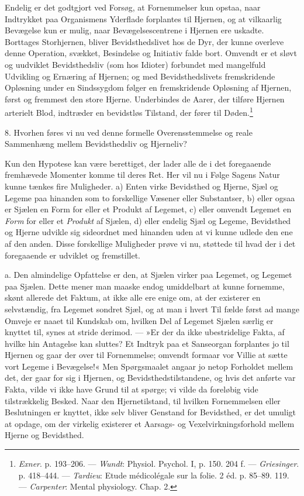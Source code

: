 \documentclass[12pt,a4paper,openany]{book}
\newcommand{\opage}[1]{\marginnote{\footnotesize\textit{[#1]}}}
\begin{document}
Endelig er det godtgjort ved Forsøg, at Fornemmelser kun opstaa, naar
Indtrykket paa Organismens Yderflade forplantes til Hjernen, og at
vilkaarlig Bevægelse kun er mulig, naar Bevægelsescentrene i Hjernen ere
uskadte. Borttages Storhjernen, bliver Bevidsthedslivet hos de Dyr, der
kunne overleve denne Operation, svækket, Besindelse og Initiativ falde
bort. Omvendt er et sløvt og uudviklet Bevidsthedsliv (som hos Idioter)
forbundet med mangelfuld Udvikling og Ernæring af Hjernen; og med
Bevidsthedslivets fremskridende Opløsning under en Sindssygdom følger en
fremskridende Opløsning af Hjernen, først og fremmest den store Hjerne.
Underbindes de Aarer, der tilføre Hjernen arterielt Blod, indtræder en
bevidstløs Tilstand, der fører til Døden.\footnote[1]{\emph{Exner}. p.
193--206. --- \emph{Wundt}: Physiol. Psychol. I, p. 150. 204 f. ---
\emph{Griesinger}. p. 418--444. --- \emph{Tardieu}: Etude médicolégale
sur la folie. 2 éd. p. 85--89. 119. --- \emph{Carpenter}: Mental
physiology. Chap. 2.}

8. Hvorhen føres vi nu ved denne formelle Overensstemmelse og reale
Sammenhæng mellem Bevidsthedsliv og Hjerneliv?

Kun den Hypotese kan være berettiget, der lader alle de i det
foregaaende fremhævede Momenter komme til deres Ret. Her vil nu i Følge
Sagens Natur kunne tænkes fire Muligheder. a) Enten virke Bevidsthed og
Hjerne, Sjæl og Legeme paa hinanden som to forskellige Væsener eller
Substantser, b) eller ogsaa er Sjælen en Form for eller et Produkt af
Legemet, c) eller omvendt Legemet en \emph{Form} for eller et
\emph{Produkt} af Sjælen, d) eller endelig Sjæl og Legeme, Bevidsthed og
Hjerne udvikle sig sideordnet med hinanden uden at vi kunne udlede den
ene af den anden. Disse forskellige Muligheder prøve vi nu, støttede til
hvad der i det foregaaende er udviklet og fremstillet.

a. Den almindelige Opfattelse er den, at Sjælen virker paa Legemet, og
Legemet paa Sjælen. Dette mener man maaske endog umiddelbart at kunne
fornemme, skønt allerede det Faktum, at ikke alle ere enige om, at der
existerer en selvstændig, fra Legemet sondret Sjæl, og at man i hvert
Til%
\opage{67}fælde først ad mange Omveje er naaet til Kundskab om, hvilken
Del af Legemet Sjælen særlig er knyttet til, synes at stride derimod.
--- »Er der da ikke ubestridelige Fakta, af hvilke hin Antagelse kan
sluttes? Et Indtryk paa et Sanseorgan forplantes jo til Hjernen og gaar
der over til Fornemmelse; omvendt formaar vor Villie at sætte vort
Legeme i Bevægelse!« Men Spørgsmaalet angaar jo netop Forholdet mellem
det, der gaar for sig i Hjernen, og Bevidsthedstilstandene, og hvis det
anførte var Fakta, vilde vi ikke have Grund til at spørge; vi vilde da
foreløbig vide tilstrækkelig Besked. Naar den Hjernetilstand, til
hvilken Fornemmelsen eller Beslutningen er knyttet, ikke selv bliver
Genstand for Bevidsthed, er det umuligt at opdage, om der virkelig
existerer et Aarsags- og Vexelvirkningsforhold mellem Hjerne og
Bevidsthed.
\end{document}
